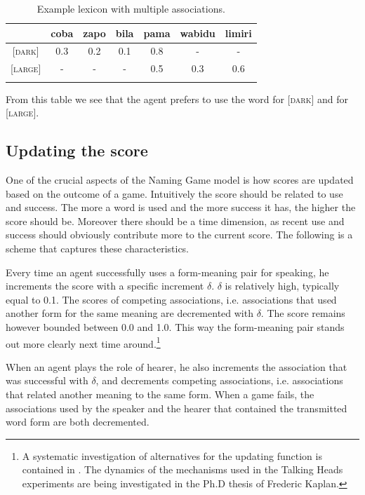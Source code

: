 \begin{table}
\begin{center}
\begin{tabular}{c c c c  c  c  c } \lsptoprule 
& coba & zapo & bila & pama & wabidu & limiri \\ 
\midrule {}		
{}[\textsc{dark}] & 0.3 & 0.2 & 0.1 & 0.8 & - & - \\ 
{}[\textsc{large}] & - & - & - & 0.5 & 0.3 & 0.6 \\ 
\lspbottomrule
\end{tabular}
\caption{\label{tab:mem2}Example lexicon with multiple associations.}
\end{center}
\end{table}
From this table we see that the agent prefers to use the 
word  for [\textsc{dark}] and  for [\textsc{large}]. 

\subsection{Updating the score}

One of the crucial aspects of the Naming Game model
is how scores are updated based on the outcome of 
a game. Intuitively 
the score should be related to use and success. 
The more a word is used and the more success it 
has, the higher the score should be. Moreover
there should be a time dimension, 
as recent use and success should obviously contribute
more to the current score. 
The following is a scheme that captures these
characteristics. 

Every time an agent successfully uses a form-meaning pair 
for speaking, he increments
the score with a specific increment $\delta$. 
$\delta$ is relatively high, typically equal to 0.1. 
The scores of competing associations, i.e. 
associations that used another form for the same meaning
are decremented with $\delta$. The score remains however bounded 
between 0.0 and 1.0. This way the  
form-meaning pair stands out more clearly next time 
around.\footnote{A systematic investigation of alternatives for 
the updating function is contained in \cite{Oliphant:1997}. 
The dynamics of the mechanisms used in the 
Talking Heads experiments are being investigated in the
Ph.D thesis of Frederic Kaplan. \nocite{Kaplan:2001}}

When an agent plays the role of hearer, he also increments
the association that was successful with $\delta$, and 
decrements competing associations, i.e. associations that related
another meaning to the same form. When a 
game fails, the associations used by the speaker
and the hearer that contained the transmitted 
word form are both decremented. 

